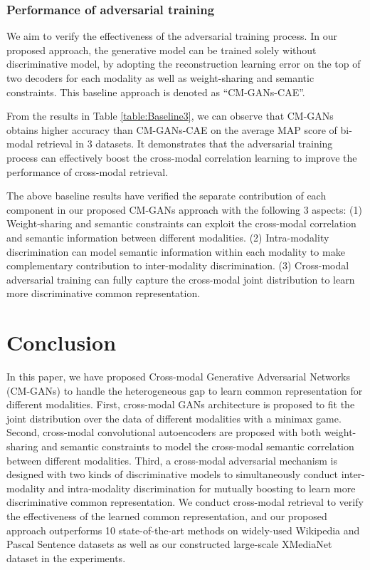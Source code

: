 \documentclass[journal]{IEEEtran}
\begin{document}
\subsubsection{Performance of adversarial training}

We aim to verify the effectiveness of the adversarial training process. In our proposed approach, the generative model can be trained solely without discriminative model, by adopting the reconstruction learning error on the top of two decoders for each modality as well as weight-sharing and semantic constraints. This baseline approach is denoted as ``CM-GANs-CAE''.

From the results in Table \ref{table:Baseline3}, we can observe that CM-GANs obtains higher accuracy than CM-GANs-CAE on the average MAP score of bi-modal retrieval in 3 datasets. It demonstrates that the adversarial training process can effectively boost the cross-modal correlation learning to improve the performance of cross-modal retrieval.

The above baseline results have verified the separate contribution of each component in our proposed CM-GANs approach with the following 3 aspects: 
(1) Weight-sharing and semantic constraints can exploit the cross-modal correlation and semantic information between different modalities.
(2) Intra-modality discrimination can model semantic information within each modality to make complementary contribution to inter-modality discrimination.
(3) Cross-modal adversarial training can fully capture the cross-modal joint distribution to learn more discriminative common representation.


\section{Conclusion}

In this paper, we have proposed Cross-modal Generative Adversarial Networks (CM-GANs) to handle the heterogeneous gap to learn common representation for different modalities. First, cross-modal GANs architecture is proposed to fit the joint distribution over the data of different modalities with a minimax game. Second, cross-modal convolutional autoencoders are proposed with both weight-sharing and semantic constraints to model the cross-modal semantic correlation between different modalities. Third, a cross-modal adversarial mechanism is designed with two kinds of discriminative models to simultaneously conduct inter-modality and intra-modality discrimination for mutually boosting to learn more discriminative common representation. We conduct cross-modal retrieval to verify the effectiveness of the learned common representation, and our proposed approach outperforms 10 state-of-the-art methods on widely-used Wikipedia and Pascal Sentence datasets as well as our constructed large-scale XMediaNet dataset in the experiments.
\end{document}
